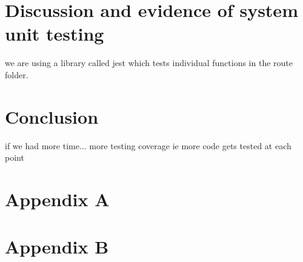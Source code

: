 \documentclass{ueacmpstyle}
\begin{document}
    \section{Discussion and evidence of system unit testing}
        
    we are using a library called jest which tests individual functions in the route folder.    
    
    
    
    \section{Conclusion}\label{sec:Con}
    
    if we had more time...
    more testing coverage ie more code gets tested at each point
    
    
	
	
	\newpage
	\appendix
        \section{Appendix A}\label{app:A}   %
            \newpage
        \section{Appendix B}\label{app:B}
\end{document}
